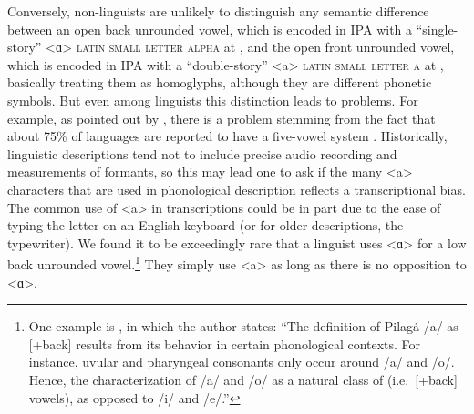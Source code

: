 \begin{itemize}
\end{itemize} 

Conversely, non-linguists are unlikely to distinguish any semantic difference
between an open back unrounded vowel, which is encoded in IPA with a
``single-story'' <ɑ> \textsc{latin small letter alpha} at , and the open
front unrounded vowel, which is encoded in IPA with a ``double-story'' <a>
\textsc{latin small letter a} at , basically treating them as
homoglyphs, although they are different phonetic symbols. But even among
linguists this distinction leads to problems. For example, as pointed out by
\citet{Mielke2009}, there is a problem stemming from the fact that about 75\% of
languages are reported to have a five-vowel system \citep{Maddieson1984}.
Historically, linguistic descriptions tend not to include precise audio
recording and measurements of formants, so this may lead one to ask if the many
<a> characters that are used in phonological description reflects a
transcriptional bias. The common use of <a> in transcriptions could be in part
due to the ease of typing the letter on an English keyboard (or for older
descriptions, the typewriter). We found it to be exceedingly rare that a
linguist uses <ɑ> for a low back unrounded vowel.\footnote{One example is
\citet[75]{Vidal2001}, in which the author states: ``The definition of Pilagá
/a/ as [+back] results from its behavior in certain phonological contexts. For
instance, uvular and pharyngeal consonants only occur around /a/ and /o/. Hence,
the characterization of /a/ and /o/ as a natural class of (i.e.\ [+back]
vowels), as opposed to /i/ and /e/.''} They simply use <a> as long as there is
no opposition to <ɑ>.



